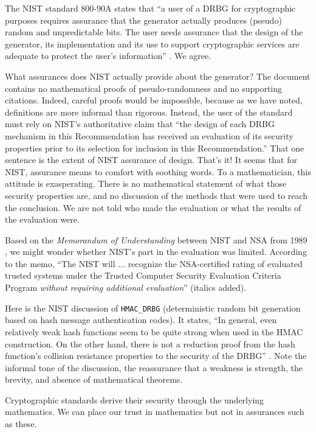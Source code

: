 \documentclass[11pt]{amsart} %
\begin{document}
The NIST standard 800-90A states that ``a user of a DRBG for cryptographic purposes requires assurance
that the generator actually produces (pseudo) random and unpredictable bits.  The user needs assurance
that the design of the generator, its implementation and its use to support cryptographic services are
adequate to protect the user's information'' \cite{NIST}. We agree.

What assurances does NIST actually provide about the generator?  
The document contains no mathematical proofs of pseudo-randomness and no supporting citations.  
Indeed, careful proofs would be impossible,
because as we have noted,
definitions are more informal than rigorous.  Instead, the user of the standard must
rely on NIST's authoritative claim that ``the design of each DRBG mechanism in this Recommendation has
received an evaluation of its security properties prior to its selection for inclusion in this Recommendation.''
That one sentence is the extent of NIST assurance of design.  That's it!  It seems that for NIST,
assurance means to comfort with soothing words. To a mathematician, this attitude is exasperating.
 There is no mathematical statement of what
those security properties are, and no discussion of the methods that were used to reach the conclusion.
We are not told who made the evaluation or what the results of the evaluation were.

Based on the {\it Memorandum of Understanding} between NIST and NSA from 1989 \cite[p.601]{ScAC}, we might
wonder whether NIST's part in the evaluation was limited.
According to the memo, ``The NIST will $\ldots$ recognize the NSA-certified rating of evaluated trusted
systems under the Trusted Computer Security Evaluation Criteria Program {\it without requiring additional
evaluation}'' (italics added). 

Here is the NIST discussion of {\tt HMAC\_DRBG}
(deterministic random bit generation based on hash message authentication codes).  It states, ``In general, even
relatively weak hash functions seem to be quite strong when used in the HMAC construction.
On the other hand, there is not a reduction proof from the hash function's collision resistance
properties to the security of the DRBG'' \cite[Appendix E.2]{NIST}. 
Note the informal tone of the discussion, the  reassurance
that a weakness is strength, the brevity, and absence of mathematical theorems.  

Cryptographic standards derive their security through the
underlying mathematics.   We can place our trust in mathematics but not in assurances such as these.
\end{document}
